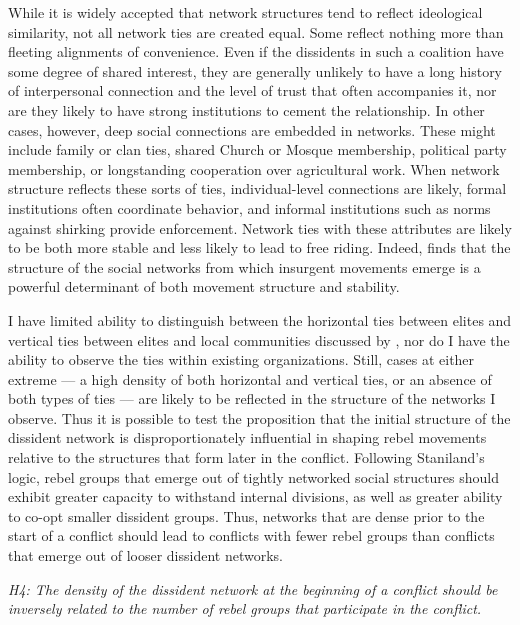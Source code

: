 While it is widely accepted that network structures tend to reflect ideological similarity, not all network ties are created equal. Some reflect nothing more than fleeting alignments of convenience. Even if the dissidents in such a coalition have some degree of shared interest, they are generally unlikely to have a long history of interpersonal connection and the level of trust that often accompanies it, nor are they likely to have strong institutions to cement the relationship.
In other cases, however, deep social connections are embedded in networks. These might include family or clan ties, shared Church or Mosque membership, political party membership, or longstanding cooperation over agricultural work. When network structure reflects these sorts of ties, individual-level connections are likely, formal institutions often coordinate behavior, and informal institutions such as norms against shirking \citep{Gould1993} provide enforcement. Network ties with these attributes are likely to be both more stable and less likely to lead to free riding. Indeed, \citet{Staniland2014} finds that the structure of the social networks from which insurgent movements emerge is a powerful determinant of both movement structure and stability.

I have limited ability to distinguish between the horizontal ties between elites and vertical ties between elites and local communities discussed by \citet{Staniland2014}, nor do I have the ability to observe the ties within existing organizations. Still, cases at either extreme --- a high density of both horizontal and vertical ties, or an absence of both types of ties --- are likely to be reflected in the structure of the networks I observe. Thus it is possible to test the proposition that the initial structure of the dissident network is disproportionately influential in shaping rebel movements relative to the structures that form later in the conflict. Following Staniland's logic, rebel groups that emerge out of tightly networked social structures should exhibit greater capacity to withstand internal divisions, as well as greater ability to co-opt smaller dissident groups. Thus, networks that are dense prior to the start of a conflict should lead to conflicts with fewer rebel groups than conflicts that emerge out of looser dissident networks.

\noindent \textit{H4: The density of the dissident network at the beginning of a conflict should be inversely related to the number of rebel groups that participate in the conflict.}
